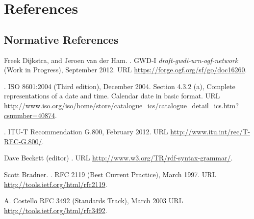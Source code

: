 %
\section*{References}%
\label{s:references}
% 
\renewcommand{\refname}{}

\subsection*{Normative References}
\begin{thebibliography}{10}
\vspace*{-3em}

Freek Dijkstra, and Jeroen van der Ham.
.
\newblock GWD-I \emph{draft-gwdi-urn-ogf-network} (Work in Progress), September 2012.
\newblock URL \url{https://forge.ogf.org/sf/go/doc16260}.

.
\newblock ISO 8601:2004 (Third edition), December 2004.
\newblock Section 4.3.2 (a), Complete representations of a date and time. Calendar date in basic format.
\newblock URL \url{http://www.iso.org/iso/home/store/catalogue_ics/catalogue_detail_ics.htm?csnumber=40874}.

.
\newblock ITU-T Recommendation G.800, February 2012.
\newblock URL \url{http://www.itu.int/rec/T-REC-G.800/}.

Dave Beckett (editor)
.
\newblock URL \url{http://www.w3.org/TR/rdf-syntax-grammar/}.

Scott Bradner.
.
\newblock RFC 2119 (Best Current Practice), March 1997.
\newblock URL \url{http://tools.ietf.org/html/rfc2119}.

A. Costello
\newblock RFC 3492 (Standards Track), March 2003
\newblock URL \url{http://tools.ietf.org/html/rfc3492}.


\end{thebibliography}
